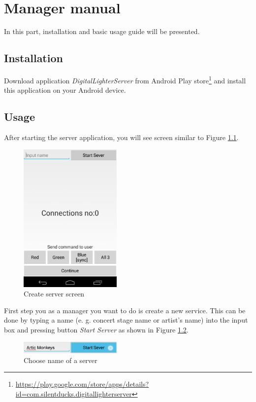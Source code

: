 \chapter{Manager manual}
In this part, installation and basic usage guide will be presented.
\section{Installation}
Download application \emph{DigitalLighterServer} from Android Play store\footnote{\url{https://play.google.com/store/apps/details?id=com.silentducks.digitallighterserver}} and install this application on your Android device.
\section{Usage}
After starting the server application, you will see screen similar to Figure \ref{fig:manual_server0}.
\begin{figure}[h]
	\centering
		\includegraphics[width=5cm]{appendix/server0.png}
	\caption{Create server screen}
	\label{fig:manual_server0}
\end{figure}

First step you as a manager you want to do is create a new service.
This can be done by typing a name (e. g. concert stage name or artist's name) into the input box and pressing button \emph{Start Server} as shown in Figure \ref{fig:manual_server1}.

\begin{figure}[h]
	\centering
		\includegraphics[width=5cm]{appendix/server2.png}
	\caption{Choose name of a server}
	\label{fig:manual_server1}
\end{figure}

